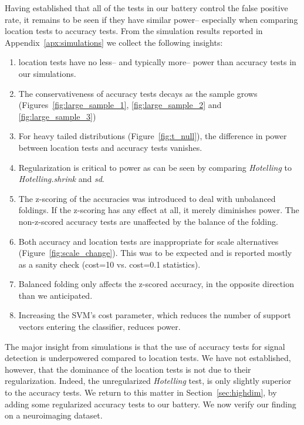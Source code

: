 \documentclass[12pt,a4paper]{article}
\begin{document}
Having established that all of the tests in our battery control the false positive rate, it remains to be seen if they have similar power-- 
especially when comparing location tests to accuracy tests. 
From the simulation results reported in Appendix~\ref{apx:simulations} we collect the following insights:
\begin{enumerate}
\item location tests have no less-- and typically more-- power than accuracy tests in our simulations.

\item The conservativeness of accuracy tests decays as the sample grows (Figures~\ref{fig:large_sample_1}, \ref{fig:large_sample_2} and \ref{fig:large_sample_3})

\item For heavy tailed distributions (Figure~\ref{fig:t_null}), the difference in power between location tests and accuracy tests vanishes. 

\item Regularization is critical to power as can be seen by comparing \emph{Hotelling} to \emph{Hotelling.shrink} and \emph{sd}.

\item The z-scoring of the accuracies was introduced to deal with unbalanced foldings. 
If the z-scoring has any effect at all, it merely diminishes power.
The non-z-scored accuracy tests are unaffected by the balance of the folding.

\item Both accuracy and location tests are inappropriate for scale alternatives (Figure~\ref{fig:scale_change}). 
This was to be expected and is reported mostly as a sanity check (cost=10 vs. cost=0.1 statistics).

\item Balanced folding only affects the z-scored accuracy, in the opposite direction than we anticipated. 

\item Increasing the SVM's cost parameter, which reduces the number of support vectors entering the classifier, reduces power. 

\end{enumerate}


The major insight from simulations is that the use of accuracy tests for signal detection is underpowered compared to location tests. 
We have not established, however, that the dominance of the location tests is not due to their regularization. Indeed, the unregularized \emph{Hotelling} test, is only slightly superior to the accuracy tests. 
We return to this matter in Section~\ref{sec:highdim}, by adding some regularized accuracy tests to our battery. 
We now verify our finding on a neuroimaging dataset.
\end{document}
